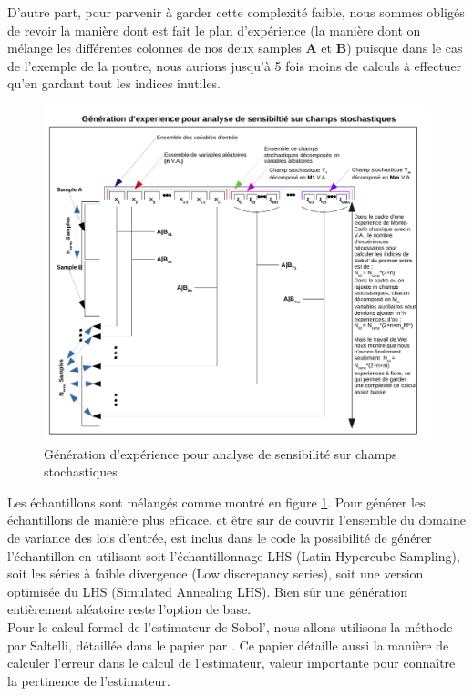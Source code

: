 \documentclass[a4paper,10pt]{article}
\begin{document}
D'autre part, pour parvenir à garder cette complexité faible, nous sommes obligés de revoir la manière dont est fait le plan d’expérience (la manière dont on mélange les différentes colonnes de nos deux samples \textbf{A} et \textbf{B}) puisque dans le cas de l'exemple de la poutre, nous aurions jusqu’à 5 fois moins de calculs à effectuer qu'en gardant tout les indices inutiles. \\
\begin{figure}[H]
   \centering   
   \includegraphics[scale=0.75]{Schema_Preparation_VA.pdf}
      \caption{Génération d’expérience pour analyse de sensibilité sur champs stochastiques}
         \label{expGenStoField}
\end{figure}
Les échantillons sont mélangés comme montré en figure \ref{expGenStoField}. 
Pour générer les échantillons de manière plus efficace, et être sur de couvrir l'ensemble du domaine de variance des lois d'entrée, est inclus dans le code la possibilité de générer l'échantillon en utilisant soit l’échantillonnage LHS (Latin Hypercube Sampling), soit les séries à faible divergence (Low discrepancy series), soit une version optimisée du LHS (Simulated Annealing LHS). Bien sûr une génération entièrement aléatoire reste l'option de base.\\

\newpage
Pour le calcul formel de l'estimateur de Sobol', nous allons utilisons la méthode par Saltelli, détaillée dans le papier par \cite{dumas2017}. Ce papier détaille aussi la manière de calculer l'erreur dans le calcul de l'estimateur, valeur importante pour connaître la pertinence de l'estimateur. 
\end{document}
